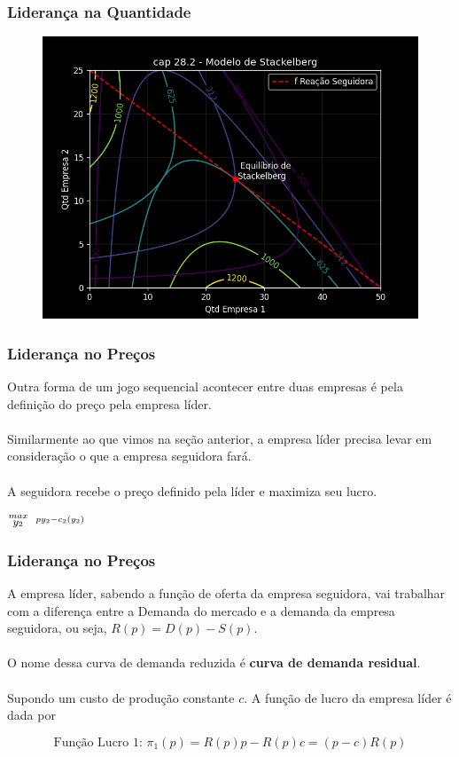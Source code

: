 \documentclass{beamer}[10]
\begin{document}
\begin{frame}
	\frametitle{Liderança na Quantidade}

	\begin{figure}[H]
		\centering
		\includegraphics[scale=0.55]{cap28_2-modelo_stackelberg_completo.png}
	\end{figure}

\end{frame}

\begin{frame}
	\frametitle{Liderança no Preços}

	Outra forma de um jogo sequencial acontecer entre duas empresas é pela definição do preço pela empresa líder. 
	\\~\\
	Similarmente ao que vimos na seção anterior, a empresa líder precisa levar em consideração o que a empresa seguidora fará.
	\\~\\
	A seguidora recebe o preço definido pela líder e maximiza seu lucro.

	\begin{center}
		\LARGE $\stackrel{max}{\text{\small $y_2$}} \ \ \stackrel{py_2 - c_2(y_2)}{\ }$ \\
	\end{center}

\end{frame}

\begin{frame}
	\frametitle{Liderança no Preços}

	A empresa líder, sabendo a função de oferta da empresa seguidora, vai trabalhar com a diferença entre a Demanda do mercado e a demanda da empresa seguidora, ou seja, $R(p) = D(p) - S(p)$. 
	\\~\\
	O nome dessa curva de demanda reduzida é \textbf{curva de demanda residual}.
	\\~\\
	Supondo um custo de produção constante $c$. A função de lucro da empresa líder é dada por

	$$ \textrm{Função Lucro 1: } \pi_1(p) = R(p)p - R(p)c = (p - c)R(p) $$

\end{frame}
\end{document}
